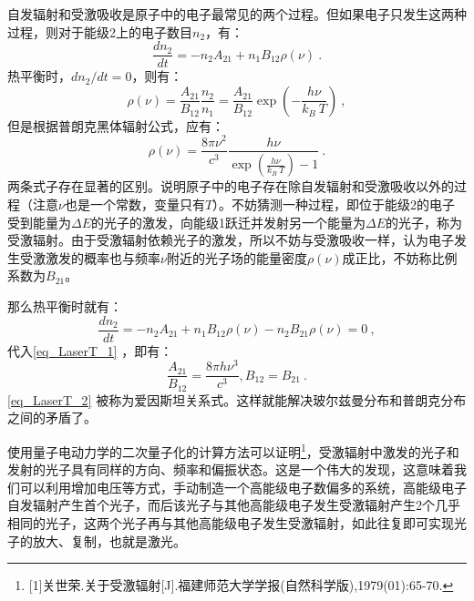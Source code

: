 自发辐射和受激吸收是原子中的电子最常见的两个过程。但如果电子只发生这两种过程，则对于能级2上的电子数目$n_2$，有：
\begin{equation}
\frac{dn_2}{dt}=-n_2A_{21}+n_1B_{12}\rho(\nu)~.
\end{equation}
热平衡时，$dn_2/dt=0$，则有：
\begin{equation}
\rho(\nu)=\frac{A_{21}}{B_{12}}\frac{n_2}{n_1}=\frac{A_{21}}{B_{12}}\exp(-\frac{h\nu}{k_B \ T})~,
\end{equation}
但是根据普朗克黑体辐射公式，应有：
\begin{equation}\label{eq_LaserT_1}
\rho(\nu)=\frac{8\pi\nu^2}{c^3}\frac{h\nu}{\exp(\frac{h\nu}{k_B\ T})-1}~.
\end{equation}
两条式子存在显著的区别。说明原子中的电子存在除自发辐射和受激吸收以外的过程（注意$\nu$也是一个常数，变量只有$T$）。不妨猜测一种过程，即位于能级2的电子受到能量为$\Delta E$的光子的激发，向能级1跃迁并发射另一个能量为$\Delta E$的光子，称为受激辐射。由于受激辐射依赖光子的激发，所以不妨与受激吸收一样，认为电子发生受激激发的概率也与频率$\nu$附近的光子场的能量密度$\rho(\nu)$成正比，不妨称比例系数为$B_{21}$。

那么热平衡时就有：
\begin{equation}
\frac{dn_2}{dt}=-n_2A_{21}+n_1B_{12}\rho(\nu)-n_2B_{21}\rho(\nu)=0~,
\end{equation}
代入\autoref{eq_LaserT_1} ，即有：
\begin{equation}\label{eq_LaserT_2}
\frac{A_{21}}{B_{12}}=\frac{8\pi h\nu^3}{c^3},B_{12}=B_{21}~.
\end{equation}
\autoref{eq_LaserT_2} 被称为爱因斯坦关系式。这样就能解决玻尔兹曼分布和普朗克分布之间的矛盾了。

使用量子电动力学的二次量子化的计算方法可以证明\footnote{[1]关世荣.关于受激辐射[J].福建师范大学学报(自然科学版),1979(01):65-70.}，受激辐射中激发的光子和发射的光子具有同样的方向、频率和偏振状态。这是一个伟大的发现，这意味着我们可以利用增加电压等方式，手动制造一个高能级电子数偏多的系统，高能级电子自发辐射产生首个光子，而后该光子与其他高能级电子发生受激辐射产生2个几乎相同的光子，这两个光子再与其他高能级电子发生受激辐射，如此往复即可实现光子的放大、复制，也就是激光。
